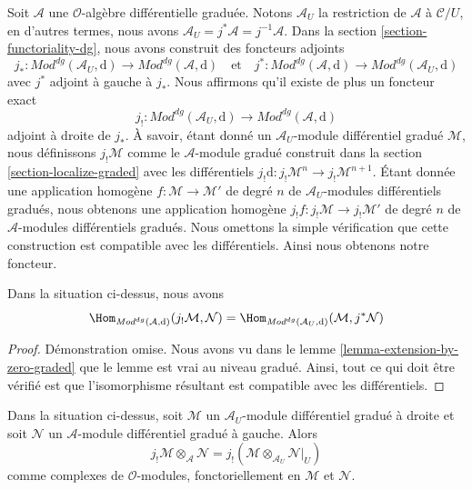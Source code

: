 \medskip\noindent
Soit $\mathcal{A}$ une $\mathcal{O}$-algèbre différentielle graduée.
Notons $\mathcal{A}_U$ la restriction de $\mathcal{A}$ à
$\mathcal{C}/U$, en d'autres termes, nous avons
$\mathcal{A}_U = j^*\mathcal{A} = j^{-1}\mathcal{A}$. Dans la section
\ref{section-functoriality-dg}, nous avons
construit des foncteurs adjoints
$$ j_*
:
\textit{Mod}^{dg}(\mathcal{A}_U, \text{d})
\longrightarrow
\textit{Mod}^{dg}(\mathcal{A}, \text{d})
\quad\text{et}\quad j^*
:
\textit{Mod}^{dg}(\mathcal{A}, \text{d})
\longrightarrow
\textit{Mod}^{dg}(\mathcal{A}_U, \text{d})
$$ avec
$j^*$ adjoint à gauche à $j_*$. Nous affirmons qu'il existe de plus un foncteur
exact
$$ j_!
:
\textit{Mod}^{dg}(\mathcal{A}_U, \text{d})
\longrightarrow
\textit{Mod}^{dg}(\mathcal{A}, \text{d})
$$ adjoint à droite
de $j_*$. À savoir, étant donné un
$\mathcal{A}_U$-module différentiel gradué $\mathcal{M}$, nous définissons $j_!\mathcal{M}$ comme
le $\mathcal{A}$-module gradué construit dans la section
\ref{section-localize-graded} avec les
différentiels
$j_!\text{d} : j_!\mathcal{M}^n \to j_!\mathcal{M}^{n + 1}$. Étant donnée
une application homogène
$f : \mathcal{M} \to \mathcal{M}'$ de degré $n$ de
$\mathcal{A}_U$-modules différentiels gradués, nous obtenons une application
homogène $j_!f : j_!\mathcal{M} \to j_!\mathcal{M}'$ de degré $n$
de $\mathcal{A}$-modules différentiels gradués. Nous omettons
la simple vérification que cette
construction est compatible avec les différentiels. Ainsi
nous obtenons notre foncteur.

\begin{lemma}
\label{lemma-extension-by-zero-dg}
Dans la situation ci-dessus, nous
avons $$
\Hom_{\textit{Mod}^{dg}(\mathcal{A}, \text{d})}(
j_!\mathcal{M}, \mathcal{N})
= \Hom_{\textit{Mod}^{dg}(\mathcal{A}_U, \text{d})}(
\mathcal{M}, j^*\mathcal{N})
$$
\end{lemma}

\begin{proof}
Démonstration omise. Nous avons vu dans le lemme \ref{lemma-extension-by-zero-graded}
que le lemme est vrai au niveau gradué. Ainsi, tout ce qui doit être
vérifié est que l'isomorphisme résultant est compatible avec les différentiels.
\end{proof}

\begin{lemma}
\label{lemma-tensor-with-extension-by-zero-dg} Dans
la situation ci-dessus, soit $\mathcal{M}$ un
$\mathcal{A}_U$-module différentiel gradué à droite et soit $\mathcal{N}$ un
$\mathcal{A}$-module différentiel gradué à gauche. Alors
$$
j_!\mathcal{M} \otimes_\mathcal{A} \mathcal{N} =
j_!(\mathcal{M} \otimes_{\mathcal{A}_U} \mathcal{N}|_U)
$$ comme
complexes de $\mathcal{O}$-modules,
fonctoriellement en $\mathcal{M}$ et $\mathcal{N}$.
\end{lemma}

